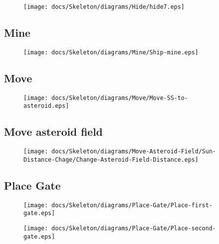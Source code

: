 \begin{figure}[H] 
    \centering 
    \texttt{[image: docs/Skeleton/diagrams/Hide/hide7.eps]} 
    \caption{} 
\end{figure} 

\subsection{Mine}

\begin{figure}[H] 
    \centering 
    \texttt{[image: docs/Skeleton/diagrams/Mine/Ship-mine.eps]} 
    \caption{} 
\end{figure} 

\subsection{Move}


\begin{figure}[H] 
    \centering 
    \texttt{[image: docs/Skeleton/diagrams/Move/Move-SS-to-asteroid.eps]} 
    \caption{} 
\end{figure} 

\subsection{Move asteroid field}

\begin{figure}[H] 
    \centering 
    \texttt{[image: docs/Skeleton/diagrams/Move-Asteroid-Field/Sun-Distance-Chage/Change-Asteroid-Field-Distance.eps]} 
    \caption{} 
\end{figure} 

\subsection{Place Gate}

\begin{figure}[H] 
    \centering 
    \texttt{[image: docs/Skeleton/diagrams/Place-Gate/Place-first-gate.eps]} 
    \caption{} 
\end{figure} 

\begin{figure}[H] 
    \centering 
    \texttt{[image: docs/Skeleton/diagrams/Place-Gate/Place-second-gate.eps]} 
    \caption{} 
\end{figure} 


